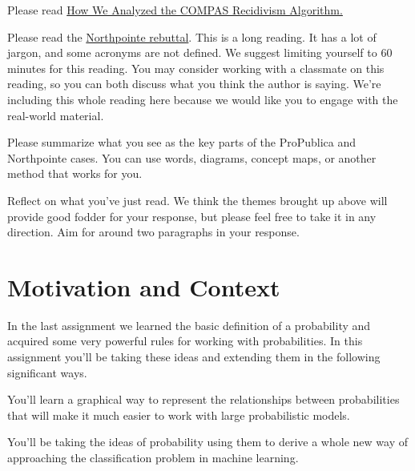 \documentclass[assignment02_Solutions]{subfiles}
\begin{document}
\begin{exercise}
Please read \href{https://www.propublica.org/article/how-we-analyzed-the-compas-recidivism-algorithm}{How We Analyzed the COMPAS Recidivism Algorithm.}

\item Please read the \href{https://drive.google.com/file/d/1SSbotzlsVkj4L2VhPC7R_XH0VBqOQsnT/view?usp=sharing}{Northpointe rebuttal}. This is a long reading. It has a lot of jargon, and some acronyms are not defined. We suggest limiting yourself to 60 minutes for this reading. You may consider working with a classmate on this reading, so you can both discuss what you think the author is saying. We're including this whole reading here because we would like you to engage with the real-world material.
\ees
\end{exercise}

\begin{exercise}
\bes
\item Please summarize what you see as the key parts of the ProPublica and Northpointe cases. You can use words, diagrams, concept maps, or another method that works for you.
\item Reflect on what you've just read.  We think the themes brought up above will provide good fodder for your response, but please feel free to take it in any direction.  Aim for around two paragraphs in your response.
\ees
\end{exercise}





\section{Motivation and Context}
In the last assignment we learned the basic definition of a probability and acquired some very powerful rules for working with probabilities.  In this assignment you'll be taking these ideas and extending them in the following significant ways.

\bi
\item You'll learn a graphical way to represent the relationships between probabilities that will make it much easier to work with large probabilistic models.
\item You'll be taking the ideas of probability using them to derive a whole new way of approaching the classification problem in machine learning.
\ei
\end{document}
